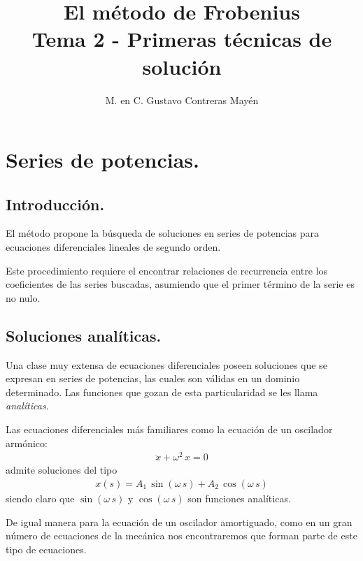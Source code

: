 
\title{El método de Frobenius \\[0.3em]  \large{Tema 2 - Primeras técnicas de solución}\vspace{-3ex}}
\author{M. en C. Gustavo Contreras Mayén}
\date{ }

\pagestyle{fancy}
\fancyhf{}
\lhead{\leftmark}
\rfoot{\thepage}
\setlength{\headheight}{16pt}%


\vspace{-4cm}
\maketitle
\fontsize{14}{14}\selectfont
\tableofcontents
\newpage
\section{Series de potencias.}
\subsection{Introducción.}

El método propone la búsqueda de soluciones en series de potencias para ecuaciones diferenciales lineales de segundo orden.
\par
Este procedimiento requiere el encontrar relaciones de recurrencia entre los coeficientes de las series buscadas, asumiendo que el primer término de la serie es no nulo.

\subsection{Soluciones analíticas.}

Una clase muy extensa de ecuaciones diferenciales poseen soluciones que se expresan en series de potencias, las cuales son válidas en un dominio determinado. Las funciones que gozan de esta particularidad se les llama \emph{analíticas}.
\par
Las ecuaciones diferenciales más familiares como la ecuación de un oscilador armónico:
 \begin{align*}
\ddot{x} + \omega^{2} \, x = 0
 \end{align*}
admite soluciones del tipo
\begin{align*}
x(s) = A_{1} \, \sin( \omega \, s) + A_{2} \, \cos (\omega \, s)
\end{align*}
siendo claro que $\sin( \omega \, s)$ y $\cos( \omega \, s)$ son funciones analíticas.
\par
De igual manera para la ecuación de un oscilador amortiguado, como en un gran número de ecuaciones de la mecánica nos encontraremos que forman parte de este tipo de ecuaciones.

